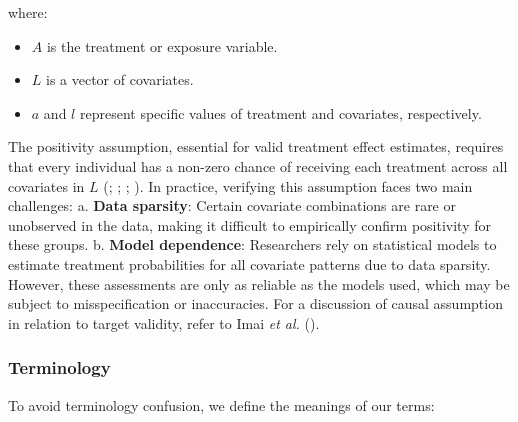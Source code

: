 \documentclass[
  single column]{article}
\providecommand{\tightlist}{%
  \setlength{\itemsep}{0pt}\setlength{\parskip}{0pt}}\usepackage{longtable,booktabs,array}
\begin{document}
where:

\begin{itemize}
\tightlist
\item
  \(A\) is the treatment or exposure variable.
\item
  \(L\) is a vector of covariates.
\item
  \(a\) and \(l\) represent specific values of treatment and covariates,
  respectively.
\end{itemize}

The positivity assumption, essential for valid treatment effect
estimates, requires that every individual has a non-zero chance of
receiving each treatment across all covariates in \(L\)
(;
;
;
). In practice,
verifying this assumption faces two main challenges: a. \textbf{Data
sparsity}: Certain covariate combinations are rare or unobserved in the
data, making it difficult to empirically confirm positivity for these
groups. b. \textbf{Model dependence}: Researchers rely on statistical
models to estimate treatment probabilities for all covariate patterns
due to data sparsity. However, these assessments are only as reliable as
the models used, which may be subject to misspecification or
inaccuracies. For a discussion of causal assumption in relation to
target validity, refer to Imai \emph{et al.}
().

\subsubsection{Terminology}\label{terminology}

To avoid terminology confusion, we define the meanings of our terms:
\end{document}
